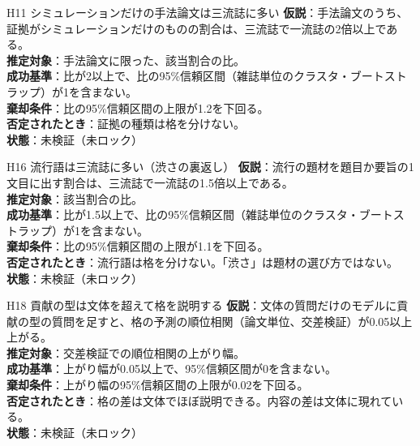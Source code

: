 \documentclass[a4paper,10pt]{ltjsarticle}
\begin{document}
\begin{hypothesis}{H11 シミュレーションだけの手法論文は三流誌に多い}
\textbf{仮説}：手法論文のうち、証拠がシミュレーションだけのものの割合は、三流誌で一流誌の2倍以上である。\\
\textbf{推定対象}：手法論文に限った、該当割合の比。\\
\textbf{成功基準}：比が2以上で、比の95\%信頼区間（雑誌単位のクラスタ・ブートストラップ）が1を含まない。\\
\textbf{棄却条件}：比の95\%信頼区間の上限が1.2を下回る。\\
\textbf{否定されたとき}：証拠の種類は格を分けない。\\
\textbf{状態}：未検証（未ロック）
\end{hypothesis}

\begin{hypothesis}{H16 流行語は三流誌に多い（渋さの裏返し）}
\textbf{仮説}：流行の題材を題目か要旨の1文目に出す割合は、三流誌で一流誌の1.5倍以上である。\\
\textbf{推定対象}：該当割合の比。\\
\textbf{成功基準}：比が1.5以上で、比の95\%信頼区間（雑誌単位のクラスタ・ブートストラップ）が1を含まない。\\
\textbf{棄却条件}：比の95\%信頼区間の上限が1.1を下回る。\\
\textbf{否定されたとき}：流行語は格を分けない。「渋さ」は題材の選び方ではない。\\
\textbf{状態}：未検証（未ロック）
\end{hypothesis}

\begin{hypothesis}{H18 貢献の型は文体を超えて格を説明する}
\textbf{仮説}：文体の質問だけのモデルに貢献の型の質問を足すと、格の予測の順位相関（論文単位、交差検証）が0.05以上上がる。\\
\textbf{推定対象}：交差検証での順位相関の上がり幅。\\
\textbf{成功基準}：上がり幅が0.05以上で、95\%信頼区間が0を含まない。\\
\textbf{棄却条件}：上がり幅の95\%信頼区間の上限が0.02を下回る。\\
\textbf{否定されたとき}：格の差は文体でほぼ説明できる。内容の差は文体に現れている。\\
\textbf{状態}：未検証（未ロック）
\end{hypothesis}
\end{document}
